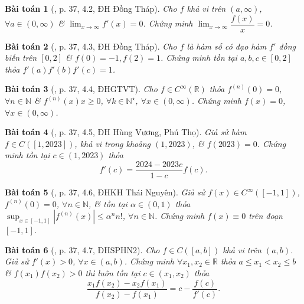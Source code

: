 \documentclass{article}
\newtheorem{baitoan}{Bài toán}
\begin{document}
\begin{baitoan}[\cite{VMS_VMC2023}, p. 37, 4.2, ĐH Đồng Tháp]
	Cho $f$ khả vi trên $(a,\infty)$, $\forall a\in(0,\infty)$ \& $\lim_{x\to\infty} f'(x) = 0$. Chứng minh $\lim_{x\to\infty} \dfrac{f(x)}{x} = 0$.
\end{baitoan}

\begin{baitoan}[\cite{VMS_VMC2023}, p. 37, 4.3, ĐH Đồng Tháp]
	Cho $f$ là hàm số có đạo hàm $f'$ đồng biến trên $[0,2]$ \& $f(0) = -1,f(2) = 1$. Chứng minh tồn tại $a,b,c\in[0,2]$ thỏa $f'(a)f'(b)f'(c) = 1$.
\end{baitoan}

\begin{baitoan}[\cite{VMS_VMC2023}, p. 37, 4.4, ĐHGTVT]
	Cho $f\in C^\infty(\mathbb{R})$ thỏa $f^{(n)}(0) = 0$, $\forall n\in\mathbb{N}$ \& $f^{(n)}(x)x\ge0$, $\forall k\in\mathbb{N}^\star$, $\forall x\in(0,\infty)$. Chứng minh $f(x) = 0$, $\forall x\in(0,\infty)$.	 
\end{baitoan}

\begin{baitoan}[\cite{VMS_VMC2023}, p. 37, 4.5, ĐH Hùng Vương, Phú Thọ]
	Giả sử hàm $f\in C([1,2023])$, khả vi trong khoảng $(1,2023)$, \& $f(2023) = 0$. Chứng minh tồn tại $c\in(1,2023)$ thỏa
	\begin{equation*}
		f'(c) = \frac{2024 - 2023c}{1 - c}f(c).
	\end{equation*}
\end{baitoan}

\begin{baitoan}[\cite{VMS_VMC2023}, p. 37, 4.6, ĐHKH Thái Nguyên]
	Giả sử $f(x)\in C^\infty([-1,1])$, $f^{(n)}(0) = 0$, $\forall n\in\mathbb{N}$, \& tồn tại $\alpha\in(0,1)$ thỏa $\sup_{x\in[-1,1]} |f^{(n)}(x)|\le\alpha^nn!$, $\forall n\in\mathbb{N}$. Chứng minh $f(x)\equiv0$ trên đoạn $[-1,1]$.
\end{baitoan}

\begin{baitoan}[\cite{VMS_VMC2023}, p. 37, 4.7, ĐHSPHN2]
	Cho $f\in C([a,b])$ khả vi trên $(a,b)$. Giả sử $f'(x) > 0$, $\forall x\in(a,b)$. Chứng minh $\forall x_1,x_2\in\mathbb{R}$ thỏa $a\le x_1 < x_2\le b$ \& $f(x_1)f(x_2) > 0$ thì luôn tồn tại $c\in(x_1,x_2)$ thỏa
	\begin{equation*}
		\frac{x_1f(x_2) - x_2f(x_1)}{f(x_2) - f(x_1)} = c - \frac{f(c)}{f'(c)}.
	\end{equation*}
\end{baitoan}
\end{document}
